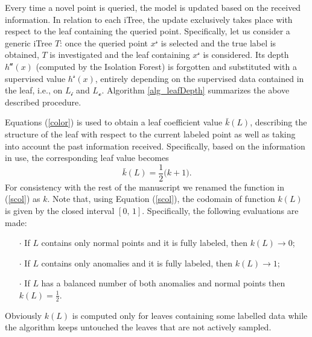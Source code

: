 Every time a novel point is queried, the model is updated based on the received information. In relation to each iTree, the update exclusively takes place with respect to the leaf containing the queried point. Specifically, let us consider a generic iTree $T$: once the queried point $x^{\mathcal{s}}$ is selected and the true label is obtained, $T$ is investigated and the leaf containing $x^{\mathcal{s}}$ is considered. Its depth $h^\mathcal{u}(x)$ (computed by the Isolation Forest) is forgotten and substituted with a supervised value $h^\mathcal{s}(x)$, entirely depending on the supervised data contained in the leaf, i.e., on $L_\mathcal{i}$ and $L_\mathcal{o}$. Algorithm \ref{alg_leafDepth} summarizes the above described procedure. 


Equations (\ref{color}) is used to obtain a leaf coefficient value $\bar{k}(L)$, describing the structure of the leaf with respect to the current labeled point as well as taking into account the past information received.
Specifically, based on the information in use, the corresponding leaf value becomes
\begin{equation}
    \bar{k}(L)= \frac{1}{2} \big(k+1 \big). \label{scol}
\end{equation}
For consistency with the rest of the manuscript we renamed the function in (\ref{scol}) as $k$. 
Note that, using Equation (\ref{scol}), the codomain of function $k(L)$ is given by the closed interval $[0, \, 1]$. Specifically, the following evaluations are made:
\begin{enumerate}
    \item[$\cdot$] If $L$ contains only normal points and it is fully labeled, then $k(L) \rightarrow 0$;
    \item[$\cdot$] If $L$ contains only anomalies and it is fully labeled, then $k(L) \rightarrow 1$; 
    \item[$\cdot$] If $L$ has a balanced number of both anomalies and normal points then $k(L) = \frac{1}{2}$.
\end{enumerate}
Obviously $k(L)$ is computed only for leaves containing some labelled data while the algorithm keeps untouched the leaves that are not actively sampled.

